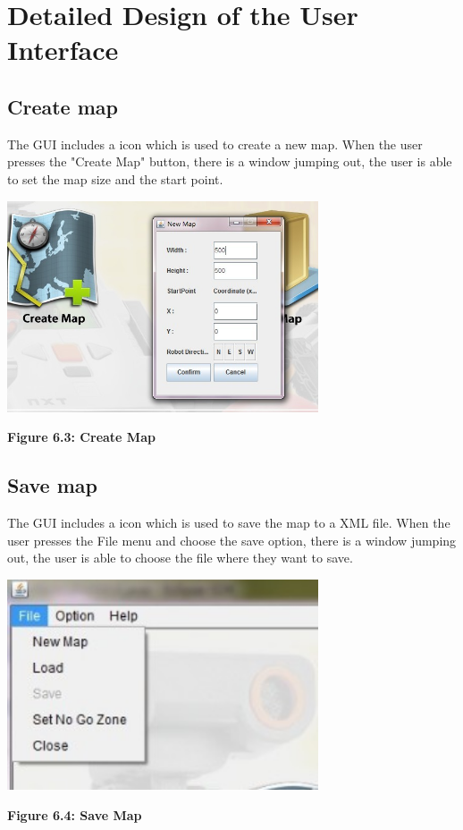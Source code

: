 \documentclass[11pt, a4paper]{report}
\begin{document}
\section{Detailed Design of the User Interface}
\subsection{Create map}
The GUI includes a icon which is used to create a new map. When the user presses the "Create Map"  button, there is a window jumping out, the user is able to set the map size and the start point.
\begin{center}
 \includegraphics[width=9.20cm]{CreateNewMap.jpg}
\end{center}
\begin{center}
\textbf {Figure 6.3: Create Map} \\[0.3cm]
\end{center}
\subsection{Save map}
The GUI includes a icon which is used to save the map to a XML file. When the user presses the File menu and choose the save option, there is a window jumping out, the user is able to choose the file where they want to save.
\begin{center}
 \includegraphics[width=9.20cm]{Menu_file.jpg}
\end{center}
\begin{center}
\textbf {Figure 6.4: Save Map} \\[0.3cm]
\end{center}
\end{document}
